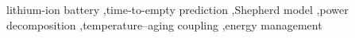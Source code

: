 \documentclass[5p,times,number]{elsarticle}
\begin{document}
\begin{frontmatter}

\begin{keyword}
lithium-ion battery \sep time-to-empty prediction \sep Shepherd model \sep power decomposition \sep temperature--aging coupling \sep energy management
\end{keyword}

\end{frontmatter}

\end{document}
